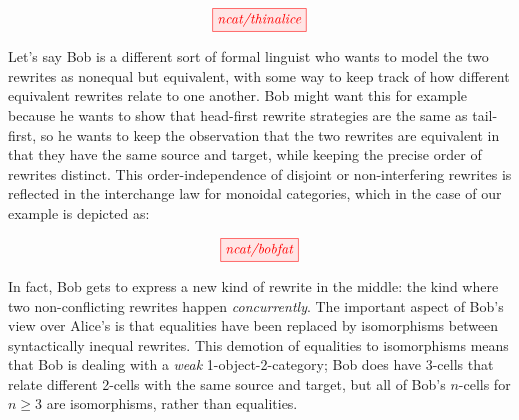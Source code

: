 \[\tikzfig{ncat/thinalice}\]

Let's say Bob is a different sort of formal linguist who wants to model the two rewrites as nonequal but equivalent, with some way to keep track of how different equivalent rewrites relate to one another. Bob might want this for example because he wants to show that head-first rewrite strategies are the same as tail-first, so he wants to keep the observation that the two rewrites are equivalent in that they have the same source and target, while keeping the precise order of rewrites distinct. This order-independence of disjoint or non-interfering rewrites is reflected in the interchange law for monoidal categories, which in the case of our example is depicted as:

\[\tikzfig{ncat/bobfat}\]

In fact, Bob gets to express a new kind of rewrite in the middle: the kind where two non-conflicting rewrites happen \emph{concurrently}. The important aspect of Bob's view over Alice's is that equalities have been replaced by isomorphisms between syntactically inequal rewrites. This demotion of equalities to isomorphisms means that Bob is dealing with a \emph{weak} 1-object-2-category; Bob does have 3-cells that relate different 2-cells with the same source and target, but all of Bob's $n$-cells for $n \geq 3$ are isomorphisms, rather than equalities.

